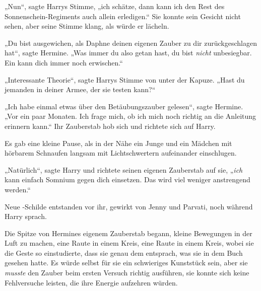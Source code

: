„Nun“, sagte Harrys Stimme, „ich schätze, dann kann ich den Rest des Sonnenschein-Regiments auch allein erledigen.“ Sie konnte sein Gesicht nicht sehen, aber seine Stimme klang, als würde er lächeln.

„Du bist ausgewichen, als Daphne deinen eigenen Zauber zu dir zurückgeschlagen hat“, sagte Hermine. „Was immer du also getan hast, du bist \emph{nicht} unbesiegbar. Ein  kann dich immer noch erwischen.“

„Interessante Theorie“, sagte Harrys Stimme von unter der Kapuze. „Hast du jemanden in deiner Armee, der sie testen kann?“

„Ich habe einmal etwas über den Betäubungszauber gelesen“, sagte Hermine. „Vor ein paar Monaten. Ich frage mich, ob ich mich noch richtig an die Anleitung erinnern kann.“ Ihr Zauberstab hob sich und richtete sich auf Harry.

Es gab eine kleine Pause, als in der Nähe ein Junge und ein Mädchen mit hörbarem Schnaufen langsam mit Lichtschwertern aufeinander einschlugen.

„Natürlich“, sagte Harry und richtete seinen eigenen Zauberstab auf sie, „\emph{ich} kann einfach Somnium gegen dich einsetzen. Das wird viel weniger anstrengend werden.“

Neue -Schilde entstanden vor ihr, gewirkt von Jenny und Parvati, noch während Harry sprach.

Die Spitze von Hermines eigenem Zauberstab begann, kleine Bewegungen in der Luft zu machen, eine Raute in einem Kreis, eine Raute in einem Kreis, wobei sie die Geste so einstudierte, dass sie genau dem entsprach, was sie in dem Buch gesehen hatte. Es würde selbst für sie ein schwieriges Kunststück sein, aber sie \emph{musste} den Zauber beim ersten Versuch richtig ausführen, sie konnte sich keine Fehlversuche leisten, die ihre Energie aufzehren würden.

